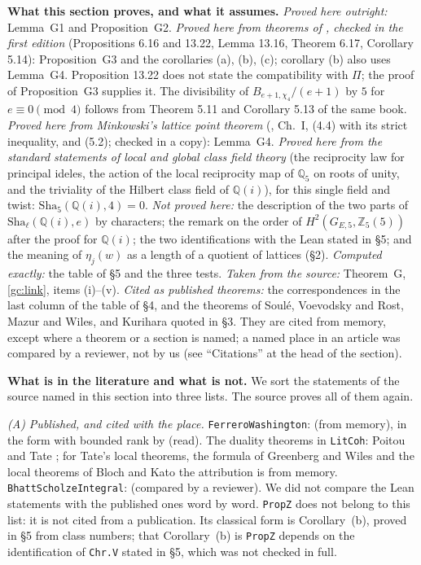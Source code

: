 \documentclass[11pt,letterpaper]{article}
\newcommand{\Z}{\mathbb Z}\newcommand{\Q}{\mathbb Q}\newcommand{\C}{\mathbb C}
\begin{document}
\textbf{What this section proves, and what it assumes.} \emph{Proved here outright:} Lemma~G1 and
Proposition~G2. \emph{Proved here from theorems of \cite{Was82}, checked in the first edition}
(Propositions 6.16 and 13.22, Lemma 13.16, Theorem 6.17, Corollary 5.14): Proposition~G3 and the corollaries
(a), (b), (c); corollary (b) also uses Lemma~G4. Proposition 13.22 does not state the compatibility with
$\Pi$; the proof of Proposition~G3 supplies it. The divisibility of
$B_{e+1,\chi_4}/(e+1)$ by $5$ for $e\equiv0\pmod4$ follows from Theorem 5.11 and Corollary 5.13 of the same
book. \emph{Proved here from Minkowski's lattice point theorem} (\cite{Neu99}, Ch.~I, (4.4) with its strict
inequality, and (5.2); checked in a copy): Lemma~G4. \emph{Proved here from the standard statements of local and global class field theory}
(the reciprocity law for principal ideles, the action of the local reciprocity map of $\Q_5$ on roots of
unity, and the triviality of the Hilbert class field of $\Q(i)$), for this single field and twist:
$\mathrm{Sha}_5(\Q(i),4)=0$.
\emph{Not proved here:}
the description of the two parts of $\mathrm{Sha}_\ell(\Q(i),e)$ by characters; the remark on the order of
$H^2(G_{E,5},\Z_5(5))$ after the proof for $\Q(i)$; the two identifications with the Lean stated in \S5; and
the meaning of $\eta_j(w)$ as a length of a quotient of lattices (\S2). \emph{Computed exactly:}
the table of \S5 and the three tests. \emph{Taken from the source:}
Theorem~G, \eqref{gc:link}, items (i)--(v). \emph{Cited as published theorems:} the
correspondences in the last column of the table of \S4, and the theorems of Soul\'e, Voevodsky and Rost,
Mazur and Wiles, and Kurihara quoted in \S3. They are cited from memory, except where a theorem or a section
is named; a named place in an article was compared by a reviewer, not by us (see ``Citations'' at the head
of the section).

\textbf{What is in the literature and what is not.} We sort the statements of the source named in this
section into three lists. The source proves all of them again.

\emph{(A) Published, and cited with the place.} \texttt{FerreroWashington}: \cite{FW79} (from memory), in the
form with bounded rank by \cite[Prop.~13.23]{Was82} (read). The duality theorems in \texttt{LitCoh}: Poitou and Tate
\cite[\S8.6]{NSW00}; for Tate's local theorems, the formula of Greenberg and Wiles and the local theorems of
Bloch and Kato the attribution is from memory. \texttt{BhattScholzeIntegral}: \cite[Thms.~1.2 and~5.6]{BS23}
(compared by a reviewer). We did not compare the Lean statements with the published ones
word by word. \texttt{PropZ} does not belong to this list: it is not cited from a publication. Its classical
form is Corollary~(b), proved in \S5 from class numbers; that Corollary~(b) is \texttt{PropZ} depends on the
identification of \texttt{Chr.V} stated in \S5, which was not checked in full.
\end{document}

